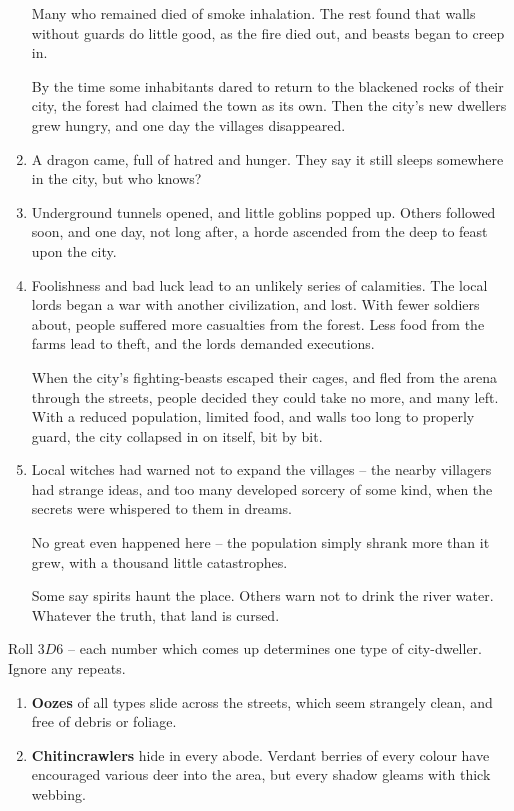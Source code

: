 \begin{multicols}{2}
\begin{enumerate}
  Many who remained died of smoke inhalation.
  The rest found that walls without guards do little good, as the fire died out, and beasts began to creep in.

  By the time some inhabitants dared to return to the blackened rocks of their city, the forest had claimed the town as its own.
  Then the city's new dwellers grew hungry, and one day the villages disappeared.
  \item
  A dragon came, full of hatred and hunger.
  They say it still sleeps somewhere in the city, but who knows?
  \item
  Underground tunnels opened, and little goblins popped up.
  Others followed soon, and one day, not long after, a horde ascended from the \gls{deep} to feast upon the city.
  \item
  Foolishness and bad luck lead to an unlikely series of calamities.
  The local lords began a war with another civilization, and lost.
  With fewer soldiers about, people suffered more casualties from the forest.
  Less food from the farms lead to theft, and the lords demanded executions.

  When the city's fighting-beasts escaped their cages, and fled from the arena through the streets, people decided they could take no more, and many left.
  With a reduced population, limited food, and walls too long to properly guard, the city collapsed in on itself, bit by bit.
  \item
  Local witches had warned not to expand the villages -- the nearby villagers had strange ideas, and too many developed sorcery of some kind, when the secrets were whispered to them in dreams.

  No great even happened here -- the population simply shrank more than it grew, with a thousand little catastrophes.

  Some say spirits haunt the place.
  Others warn not to drink the river water.
  Whatever the truth, that land is cursed.
\end{enumerate}


Roll $3D6$ -- each number which comes up determines one type of city-dweller.
Ignore any repeats.

\begin{enumerate}
  \item
  \textbf{Oozes} of all types slide across the streets, which seem strangely clean, and free of debris or foliage.
  \item
  \textbf{Chitincrawlers} hide in every abode.
  Verdant berries of every colour have encouraged various deer into the area, but every shadow gleams with thick webbing.


\end{enumerate}
\end{multicols}
